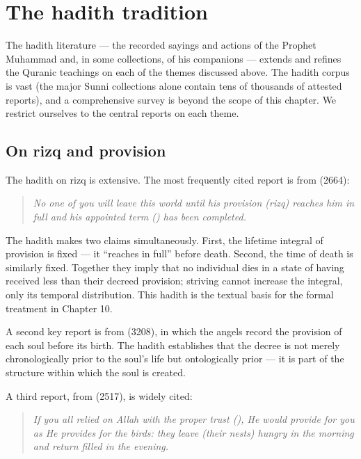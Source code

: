 \section{The hadith tradition}
\label{sec:hadith}

The hadith literature --- the recorded sayings and actions of the
Prophet Muhammad and, in some collections, of his companions ---
extends and refines the Quranic teachings on each of the themes
discussed above. The hadith corpus is vast (the major Sunni
collections alone contain tens of thousands of attested reports),
and a comprehensive survey is beyond the scope of this chapter. We
restrict ourselves to the central reports on each theme.

\subsection{On rizq and provision}

The hadith on rizq is extensive. The most frequently cited report is
from  (2664):

\begin{quote}
\textit{No one of you will leave this world until his provision
(rizq) reaches him in full and his appointed term ()
has been completed.}
\end{quote}

The hadith makes two claims simultaneously. First, the lifetime
integral of provision is fixed --- it ``reaches in full'' before
death. Second, the time of death is similarly fixed. Together they
imply that no individual dies in a state of having received less than
their decreed provision; striving cannot increase the integral, only
its temporal distribution. This hadith is the textual basis for the
formal treatment in Chapter 10.

A second key report is from  (3208), in
which the angels record the provision of each soul before its birth.
The hadith establishes that the decree is not merely chronologically
prior to the soul's life but ontologically prior --- it is part of
the structure within which the soul is created.

A third report, from  (2517), is widely cited:

\begin{quote}
\textit{If you all relied on Allah with the proper trust
(), He would provide for you as He provides for the
birds: they leave (their nests) hungry in the morning and return
filled in the evening.}
\end{quote}

